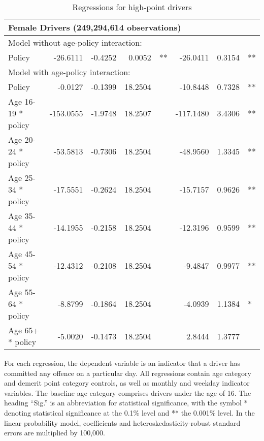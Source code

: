 \begin{table}
\begin{tabular}{l r r r l r r l}
\hline 

\multicolumn{7}{l}{\textbf{Female Drivers} (249,294,614 observations)} \\ 

\hline
\multicolumn{7}{l}{Model without age-policy interaction: } \\ 
Policy                   &  -26.6111       &  -0.4252        &  0.0052       &   **       &  -26.0411        &  0.3154       &   **       \\ 
\hline
\multicolumn{7}{l}{Model with age-policy interaction: } \\ 
Policy                   &  -0.0127       &  -0.1399        &  18.2504       &            &  -10.8448        &  0.7328       &   **       \\ 
Age 16-19 * policy   &  -153.0555       &  -1.9748        &  18.2507       &            &  -117.1480        &  3.4306       &   **       \\ 
Age 20-24 * policy   &  -53.5813       &  -0.7306        &  18.2504       &            &  -48.9560        &  1.3345       &   **       \\ 
Age 25-34 * policy   &  -17.5551       &  -0.2624        &  18.2504       &            &  -15.7157        &  0.9626       &   **       \\ 
Age 35-44 * policy   &  -14.1955       &  -0.2158        &  18.2504       &            &  -12.3196        &  0.9599       &   **       \\ 
Age 45-54 * policy   &  -12.4312       &  -0.2108        &  18.2504       &            &  -9.4847        &  0.9977       &   **       \\ 
Age 55-64 * policy   &  -8.8799       &  -0.1864        &  18.2504       &            &  -4.0939        &  1.1384       &    *       \\ 
Age 65+ * policy   &  -5.0020       &  -0.1473        &  18.2504       &            &  2.8444        &  1.3777       &            \\ 

\hline 

\end{tabular} 
\caption{Regressions for high-point drivers} 
For each regression, the dependent variable is an indicator that a driver has committed  
any offence on a particular day.  
All regressions contain age category and demerit point category controls, 
as well as monthly and weekday indicator variables. 
The baseline age category comprises drivers under the age of 16. 
The heading ``Sig.'' is an abbreviation for statistical significance, with 
the symbol * denoting statistical significance at the 0.1\% level 
and ** the 0.001\% level. 
In the linear probability model, coefficients and heteroskedasticity-robust standard errors are  
multiplied by 100,000.  
\label{tab:seas_Logit_vs_LPMx100K_high_pt_regs} 
\end{table} 
 
